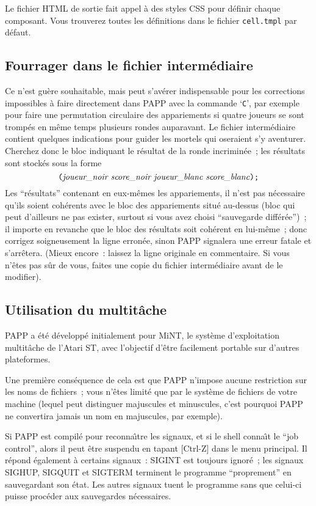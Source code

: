 \documentclass[10pt]{article}
\begin{document}
Le fichier HTML de sortie fait appel \`a des styles CSS pour d\'efinir chaque composant.
Vous trouverez toutes les d\'efinitions dans le fichier \verb|cell.tmpl| par d\'efaut.

\subsection{Fourrager dans le fichier interm\'ediaire}

Ce n'est gu\`ere souhaitable, mais peut s'av\'erer indispensable pour 
les corrections impossibles \`a faire directement dans PAPP avec la 
commande `\verb|C|', par exemple pour faire une permutation circulaire 
des appariements si quatre joueurs se sont tromp\'es en m\^eme temps 
plusieurs rondes auparavant.  Le fichier interm\'ediaire contient 
quelques indications pour guider les mortels qui oseraient s'y 
aventurer.  Cherchez donc le bloc indiquant le r\'esultat de la ronde 
incrimin\'ee~; les r\'esultats sont stock\'es sous la forme 
$$\hbox{\verb|(|{\it joueur\_noir score\_noir joueur\_blanc 
score\_blanc\/}\verb|);|}
 $$
Les ``r\'esultats'' contenant en eux-m\^emes les appariements, il 
n'est pas n\'ecessaire qu'ils soient coh\'erents avec le bloc des 
appariements situ\'e au-dessus (bloc qui peut d'ailleurs ne pas 
exister, surtout si vous avez choisi ``sauvegarde diff\'er\'ee'')~; il 
importe en revanche que le bloc des r\'esultats soit coh\'erent en 
lui-m\^eme~; donc corrigez soigneusement la ligne erron\'ee, sinon PAPP 
signalera une erreur fatale et s'arr\^etera.  (Mieux encore~: laissez 
la ligne originale en commentaire.  Si vous n'\^etes pas s\^ur de 
vous, faites une copie du fichier interm\'ediaire avant de le 
modifier).

\subsection{Utilisation du multit\^ache}

PAPP a \'et\'e d\'evelopp\'e initialement pour MiNT, le syst\`eme 
d'exploitation multit\^ache de l'Atari ST, avec l'objectif d'\^etre 
facilement portable sur d'autres plateformes.

Une premi\`ere cons\'equence de cela est que PAPP n'impose aucune 
restriction sur les noms de fichiers~; vous n'\^etes limit\'e que par 
le syst\`eme de fichiers de votre machine (lequel peut distinguer 
majuscules et minuscules, c'est pourquoi PAPP ne convertira jamais un 
nom en majuscules, par exemple).

Si PAPP est compil\'e pour reconna{\^\i}tre les signaux, et si le 
shell conna{\^\i}t le ``job control'', alors il peut \^etre suspendu 
en tapant [Ctrl-Z] dans le menu principal.  Il r\'epond \'egalement 
\`a certains signaux~: SIGINT est toujours ignor\'e~; les signaux 
SIGHUP, SIGQUIT et SIGTERM terminent le programme ``proprement'' en 
sauvegardant son \'etat.  Les autres signaux tuent le programme sans 
que celui-ci puisse proc\'eder aux sauvegardes n\'ecessaires.
\end{document}
